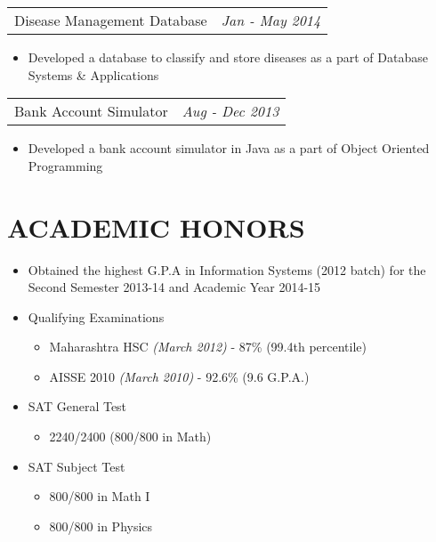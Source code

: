 \documentclass[margin]{res}
\begin{document}
\begin{resume}
\begin{itemize}
                  \end{itemize}
		 \begin{tabular}{p{4.2in} r}
                  Disease Management Database &  \textit{Jan - May 2014}
                 \end{tabular}	
		  \begin{itemize} 
                   \item[]  Developed a database to classify and store diseases as a part of Database Systems \& Applications
                  \end{itemize}
                  
                 \begin{tabular}{p{4.2in} r} %
                  Bank Account Simulator &  \textit{Aug - Dec 2013}
                 \end{tabular}
                  \begin{itemize}					        
                   \item[] Developed a bank account simulator in Java as a part of Object Oriented \\Programming 
                  \end{itemize}
                  
 

                  

\section{ACADEMIC HONORS} 
			\begin{itemize}
			
				  \item Obtained the highest G.P.A in Information Systems (2012 batch) for the Second Semester 2013-14 and Academic Year 2014-15
                  \item Qualifying Examinations 
                  	\begin{itemize}
                  	\item Maharashtra HSC \textit{(March 2012)} - 87\% (99.4th percentile)
                      	\item AISSE 2010 \textit{(March 2010)} - 92.6\% (9.6 G.P.A.)
                  	\end{itemize}
                  \item SAT General Test
                  	\begin{itemize}
                  	\item 2240/2400 (800/800 in Math)
                  	\end{itemize}
                  	\item SAT Subject Test
                  	\begin{itemize}
                  	\item 800/800 in Math I
                  	\item 800/800 in Physics
                  	\end{itemize}
                  \end{itemize}
			   	

\end{resume}
\end{document}
